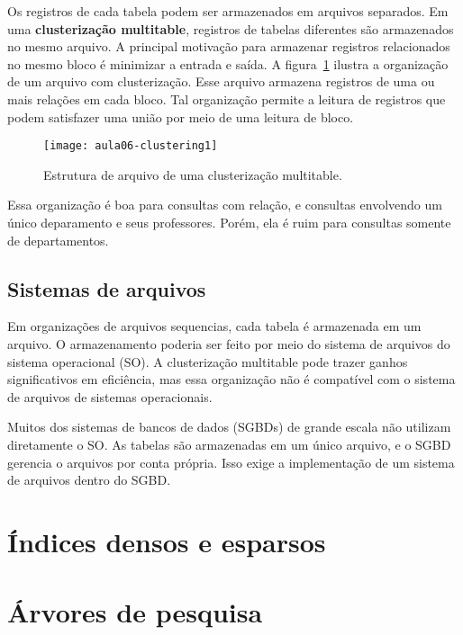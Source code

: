 Os registros de cada tabela podem ser armazenados em arquivos separados.
Em uma \textbf{clusterização multitable}, registros de tabelas diferentes são armazenados no mesmo 
arquivo.
A principal motivação para armazenar registros relacionados no mesmo bloco é minimizar
a entrada e saída.
A figura~\ref{aula06:fig:clustering1} ilustra a organização de um arquivo com clusterização.
Esse arquivo armazena registros de uma ou mais relações em cada bloco.
Tal organização permite a leitura de registros que podem satisfazer uma união por meio de 
uma leitura de bloco.
%
\begin{figure}[!htb]
\centering
\texttt{[image: aula06-clustering1]}
\caption{Estrutura de arquivo de uma clusterização multitable.}
\label{aula06:fig:clustering1}
\end{figure}

Essa organização é boa para consultas com relação, e consultas envolvendo um único
deparamento e seus professores.
Porém, ela é ruim para consultas somente de departamentos.

\subsection{Sistemas de arquivos}

Em organizações de arquivos sequencias, cada tabela é armazenada em um arquivo.
O armazenamento poderia ser feito por meio do sistema de arquivos do sistema
operacional (SO).
A clusterização multitable pode trazer ganhos significativos em eficiência, mas 
essa organização não é compatível com o sistema de arquivos de sistemas operacionais.

Muitos dos sistemas de bancos de dados (SGBDs) de grande escala não utilizam diretamente o SO.
As tabelas são armazenadas em um único arquivo, e o SGBD gerencia o arquivos por conta própria.
Isso exige a implementação de um sistema de arquivos dentro do SGBD.

\section{Índices densos e esparsos}

\section{Árvores de pesquisa}

